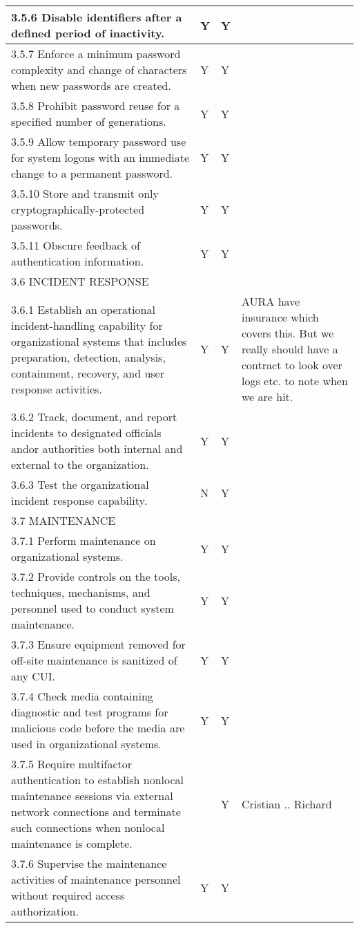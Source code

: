 \begin{longtable} {|p{}|p{}|p{}|p{} |}
{3.5.6 Disable identifiers after a defined period of inactivity.}&{Y}&{Y}& \\ \hline
{3.5.7 Enforce a minimum password complexity and change of characters when new passwords are created.}&{Y}&{Y}& \\ \hline
{3.5.8 Prohibit password reuse for a specified number of generations.}&{Y}&{Y}& \\ \hline
{3.5.9 Allow temporary password use for system logons with an immediate change to a permanent password.}&{Y}&{Y}& \\ \hline
{3.5.10 Store and transmit only cryptographically-protected passwords.}&{Y}&{Y}& \\ \hline
{3.5.11 Obscure feedback of authentication information.}&{Y}&{Y}& \\ \hline
{3.6 INCIDENT RESPONSE}&&& \\ \hline
{3.6.1 Establish an operational incident-handling capability for organizational systems that includes preparation, detection, analysis, containment, recovery, and user response activities.}&{Y}&{Y}&{AURA have insurance which covers this. But we really should have a contract to look over logs etc. to note when we are hit.} \\ \hline
{3.6.2 Track, document, and report incidents to designated officials and\/or authorities both internal and external to the organization.}&{Y}&{Y}& \\ \hline
{3.6.3 Test the organizational incident response capability.}&{N}&{Y}& \\ \hline
{3.7 MAINTENANCE}&&& \\ \hline
{3.7.1 Perform maintenance on organizational systems.}&{Y}&{Y}& \\ \hline
{3.7.2 Provide controls on the tools, techniques, mechanisms, and personnel used to conduct system maintenance.}&{Y}&{Y}& \\ \hline
{3.7.3 Ensure equipment removed for off-site maintenance is sanitized of any CUI.}&{Y}&{Y}& \\ \hline
{3.7.4 Check media containing diagnostic and test programs for malicious code before the media are used in organizational systems.}&{Y}&{Y}& \\ \hline
{3.7.5 Require multifactor authentication to establish nonlocal maintenance sessions via external network connections and terminate such connections when nonlocal maintenance is complete.}&{}&{Y}&{Cristian .. Richard} \\ \hline
{3.7.6 Supervise the maintenance activities of maintenance personnel without required access authorization.}&{Y}&{Y}& \\ \hline

\end{longtable}
